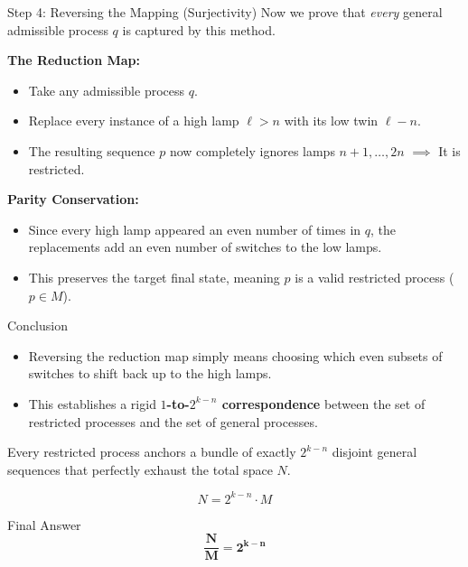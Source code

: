 \documentclass[10pt]{beamer}
\begin{document}
\begin{frame}{Step 4: Reversing the Mapping (Surjectivity)}
Now we prove that \textit{every} general admissible process $q$ is captured by this method.

\vspace{0.3cm}
\textbf{The Reduction Map:}
\begin{itemize}
    \item Take any admissible process $q$.
    \item Replace every instance of a high lamp $\ell > n$ with its low twin $\ell - n$.
    \item The resulting sequence $p$ now completely ignores lamps $n+1, \dots, 2n$ $\implies$ It is restricted.
\end{itemize}

\pause
\vspace{0.2cm}
\textbf{Parity Conservation:}
\begin{itemize}
    \item Since every high lamp appeared an even number of times in $q$, the replacements add an even number of switches to the low lamps.
    \item This preserves the target final state, meaning $p$ is a valid restricted process ($p \in M$).
\end{itemize}
\end{frame}

\begin{frame}{Conclusion}
\begin{itemize}
    \item Reversing the reduction map simply means choosing which even subsets of switches to shift back up to the high lamps.
    \item This establishes a rigid \textbf{$1$-to-$2^{k-n}$ correspondence} between the set of restricted processes and the set of general processes.
\end{itemize}

\pause
\vspace{0.4cm}
Every restricted process anchors a bundle of exactly $2^{k-n}$ disjoint general sequences that perfectly exhaust the total space $N$.

\[
N = 2^{k-n} \cdot M
\]

\vspace{0.2cm}
\begin{block}{Final Answer}
\[
\mathbf{\frac{N}{M} = 2^{k-n}}
\]
\end{block}
\end{frame}
\end{document}
